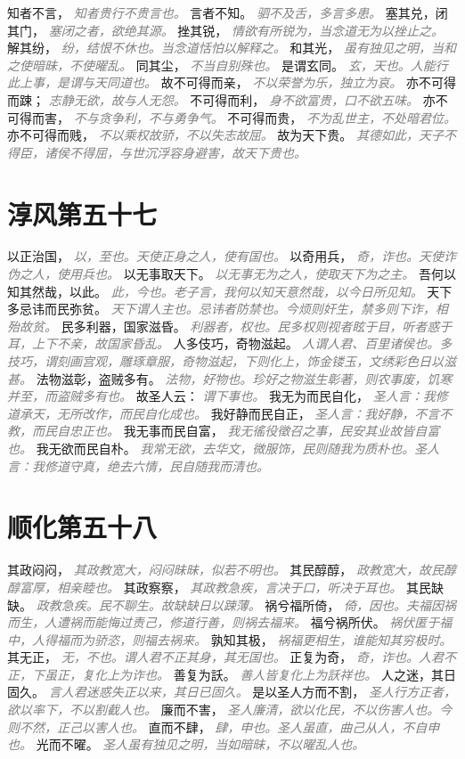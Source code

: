 \documentclass[a4paper,zihao=-4,oneside,landscape,UTF8]{ctexart}
\newcommand{\zhushi}[1]{\scriptsize{\textit{\textcolor{gray}{#1}}}\normalsize}
\begin{document}
知者不言，
\zhushi{知者贵行不贵言也。}
言者不知。
\zhushi{驷不及舌，多言多患。}
塞其兑，闭其门，
\zhushi{塞闭之者，欲绝其源。}
挫其锐，
\zhushi{情欲有所锐为，当念道无为以挫止之。}
解其纷，
\zhushi{纷，结恨不休也。当念道恬怕以解释之。}
和其光，
\zhushi{虽有独见之明，当和之使暗昧，不使曜乱。}
同其尘，
\zhushi{不当自别殊也。}
是谓玄同。
\zhushi{玄，天也。人能行此上事，是谓与天同道也。}
故不可得而亲，
\zhushi{不以荣誉为乐，独立为哀。}
亦不可得而踈；
\zhushi{志静无欲，故与人无怨。}
不可得而利，
\zhushi{身不欲富贵，口不欲五味。}
亦不可得而害，
\zhushi{不与贪争利，不与勇争气。}
不可得而贵，
\zhushi{不为乱世主，不处暗君位。}
亦不可得而贱，
\zhushi{不以乘权故骄，不以失志故屈。}
故为天下贵。
\zhushi{其德如此，天子不得臣，诸侯不得屈，与世沉浮容身避害，故天下贵也。}


\section{淳风第五十七}

以正治国，
\zhushi{以，至也。天使正身之人，使有国也。}
以奇用兵，
\zhushi{奇，诈也。天使诈伪之人，使用兵也。}
以无事取天下。
\zhushi{以无事无为之人，使取天下为之主。}
吾何以知其然哉，以此。
\zhushi{此，今也。老子言，我何以知天意然哉，以今日所见知。}
天下多忌讳而民弥贫。
\zhushi{天下谓人主也。忌讳者防禁也。今烦则奸生，禁多则下诈，相殆故贫。}
民多利器，国家滋昏。
\zhushi{利器者，权也。民多权则视者眩于目，听者惑于耳，上下不亲，故国家昏乱。}
人多伎巧，奇物滋起。
\zhushi{人谓人君、百里诸侯也。多技巧，谓刻画宫观，雕琢章服，奇物滋起，下则化上，饰金镂玉，文绣彩色日以滋甚。}
法物滋彰，盗贼多有。
\zhushi{法物，好物也。珍好之物滋生彰著，则农事废，饥寒并至，而盗贼多有也。}
故圣人云：
\zhushi{谓下事也。}
我无为而民自化，
\zhushi{圣人言：我修道承天，无所改作，而民自化成也。}
我好静而民自正，
\zhushi{圣人言：我好静，不言不教，而民自忠正也。}
我无事而民自富，
\zhushi{我无徭役徵召之事，民安其业故皆自富也。}
我无欲而民自朴。
\zhushi{我常无欲，去华文，微服饰，民则随我为质朴也。圣人言：我修道守真，绝去六情，民自随我而清也。}


\section{顺化第五十八}

其政闷闷，
\zhushi{其政教宽大，闷闷昧昧，似若不明也。}
其民醇醇，
\zhushi{政教宽大，故民醇醇富厚，相亲睦也。}
其政察察，
\zhushi{其政教急疾，言决于口，听决于耳也。}
其民缺缺。
\zhushi{政教急疾。民不聊生。故缺缺日以踈薄。}
祸兮福所倚，
\zhushi{倚，因也。夫福因祸而生，人遭祸而能悔过责己，修道行善，则祸去福来。}
福兮祸所伏。
\zhushi{祸伏匿于福中，人得福而为骄恣，则福去祸来。}
孰知其极，
\zhushi{祸福更相生，谁能知其穷极时。}
其无正，
\zhushi{无，不也。谓人君不正其身，其无国也。}
正复为奇，
\zhushi{奇，诈也。人君不正，下虽正，复化上为诈也。}
善复为訞。
\zhushi{善人皆复化上为訞祥也。}
人之迷，其日固久。
\zhushi{言人君迷惑失正以来，其日已固久。}
是以圣人方而不割，
\zhushi{圣人行方正者，欲以率下，不以割截人也。}
廉而不害，
\zhushi{圣人廉清，欲以化民，不以伤害人也。今则不然，正己以害人也。}
直而不肆，
\zhushi{肆，申也。圣人虽直，曲己从人，不自申也。}
光而不曜。
\zhushi{圣人虽有独见之明，当如暗昧，不以曜乱人也。}
\end{document}
